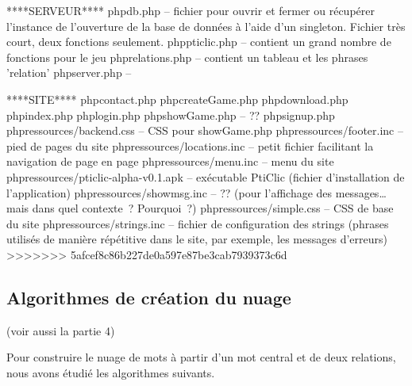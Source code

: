 \documentclass[a4paper,11pt,french]{article}
\begin{document}
****SERVEUR****
php\/db.php -- fichier pour ouvrir et fermer ou récupérer l'instance de l'ouverture de la base de données à l'aide d'un singleton. 
		Fichier très court, deux fonctions seulement.
php\/pticlic.php -- contient un grand nombre de fonctions pour le jeu
php\/relations.php -- contient un tableau et les phrases 'relation'
php\/server.php --



****SITE****
php\/contact.php
php\/createGame.php
php\/download.php
php\/index.php
php\/login.php
php\/showGame.php -- ??
php\/signup.php
php\/ressources/backend.css  -- CSS pour showGame.php
php\/ressources/footer.inc  -- pied de pages du site
php\/ressources/locations.inc  -- petit fichier facilitant la navigation de page en page
php\/ressources/menu.inc  -- menu du site
php\/ressources/pticlic-alpha-v0.1.apk  -- exécutable PtiClic (fichier d'installation de l'application)
php\/ressources/showmsg.inc  -- ?? (pour l'affichage des messages… mais dans quel contexte~? Pourquoi~?)
php\/ressources/simple.css  -- CSS de base du site
php\/ressources/strings.inc -- fichier de configuration des strings (phrases utilisés de manière répétitive dans le site, par exemple, les messages d'erreurs)
>>>>>>> 5afcef8c86b227de0a597e87be3cab7939373c6d

\subsection{Algorithmes de création du nuage}

(voir aussi la partie 4)

Pour construire le nuage de mots à partir d'un mot central et de deux relations, nous avons étudié les algorithmes suivants.
\end{document}
